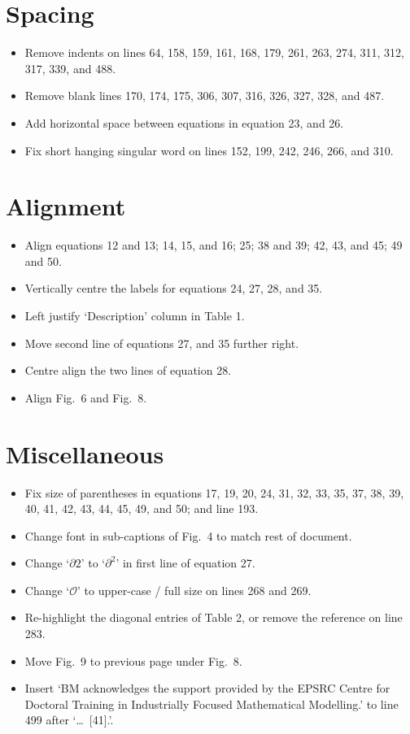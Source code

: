 \documentclass[11pt,a4paper]{article}
\begin{document}
\section{Spacing}
\begin{itemize}
	\item Remove indents on lines 64, 158, 159, 161, 168, 179, 261, 263, 274, 311, 312, 317, 339, and 488.
	\item Remove blank lines 170, 174, 175, 306, 307, 316, 326, 327, 328, and 487.
	\item Add horizontal space between equations in equation 23, and 26.
	\item Fix short hanging singular word on lines 152, 199, 242, 246, 266, and 310.
\end{itemize}

\section{Alignment}
\begin{itemize}
	\item Align equations 12 and 13; 14, 15, and 16; 25; 38 and 39; 42, 43, and 45; 49 and 50.
	\item Vertically centre the labels for equations 24, 27, 28, and 35.
	\item Left justify `Description' column in Table 1.
	\item Move second line of equations 27, and 35 further right.
	\item Centre align the two lines of equation 28.
	\item Align Fig.~6 and Fig.~8.
\end{itemize}


\section{Miscellaneous}
\begin{itemize}
	\item Fix size of parentheses in equations 17, 19, 20, 24, 31, 32, 33, 35, 37, 38, 39, 40, 41, 42, 43, 44, 45, 49, and 50; and line 193.
	\item Change font in sub-captions of Fig.~4 to match rest of document.
	\item Change `$\partial 2$' to `$\partial^2$' in first line of equation 27.
	\item Change `$\mathcal{O}$' to upper-case / full size on lines 268 and 269.
	\item Re-highlight the diagonal entries of Table 2, or remove the reference on line 283.
	\item Move Fig.~9 to previous page under Fig.~8.
	\item Insert `BM acknowledges the support provided by the EPSRC Centre for Doctoral Training in Industrially Focused Mathematical Modelling.' to line 499 after `\ldots\ [41].'.
\end{itemize}

%
\end{document}
